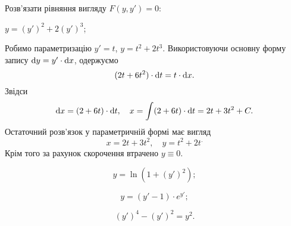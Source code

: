 Розв’язати рівняння вигляду $F(y, y') = 0$:
\begin{example}
	$y = (y')^2 + 2 (y')^3$;
\end{example}
\begin{solution}
	Робимо параметризацію $y' = t$, $y = t^2 + 2t^3$. Використовуючи основну форму запису $\mathop{}\!\mathrm{d} y = y' \cdot \mathop{}\!\mathrm{d} x$, одержуємо
	\[ (2t + 6t^2) \cdot \mathop{}\!\mathrm{d} t = t \cdot \mathop{}\!\mathrm{d} x.\]
	Звідси \[ \mathop{}\!\mathrm{d} x = (2 + 6t) \cdot \mathop{}\!\mathrm{d} t, \quad x = \int(2+6t) \cdot \mathop{}\!\mathrm{d} t = 2t + 3t^2 + C.\]
	Остаточний розв’язок у параметричній формі має вигляд 
	\[ x = 2t + 3t^2, \quad y = t^2 + 2t^.\]
	Крім того за рахунок скорочення втрачено $y \equiv 0$.
\end{solution}
\begin{multicols}{2}
\begin{problem}
	\[ y = \ln ( 1 + (y')^2); \]
\end{problem}
\begin{problem}
	\[ y = (y' - 1) \cdot e^{y'}; \]
\end{problem}
\begin{problem}
 	\[ (y')^4 - (y')^2 = y^2. \]
\end{problem}
\end{multicols}


